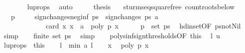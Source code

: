 \begin{isabellebody}
\ \ \ \ \ \ \isamarkupfalse%
\ lu{\isacharunderscore}props\ \isamarkupfalse%
\ auto\isanewline
\ \ \isamarkupfalse%
\ \isamarkupfalse%
\ {\isacharquery}thesis\ \isacommand{{\isachardot}}\isamarkupfalse%
\isanewline
{}\isamarkupfalse%
%
\endisatagproof
{\isafoldproof}%
%
\isadelimproof
\isanewline
%
\endisadelimproof
\isanewline
{}\isamarkupfalse%
\ {\isacharparenleft}\ sturm{\isacharunderscore}seq{\isacharunderscore}squarefree{\isacharparenright}\ count{\isacharunderscore}roots{\isacharunderscore}below{\isacharcolon}\isanewline
\ \ \ {\isachardoublequoteopen}p\ {\isasymnoteq}\ {}{\isachardoublequoteclose}\isanewline
\ \ \ {\isachardoublequoteopen}sign{\isacharunderscore}changes{\isacharunderscore}neg{\isacharunderscore}inf\ ps\ {\isacharminus}\ sign{\isacharunderscore}changes\ ps\ a\ {\isacharequal}\ \isanewline
\ \ \ \ \ \ \ \ \ \ \ \ \ card\ {\isacharbraceleft}x{\isachardot}\ x\ {\isasymle}\ a\ {\isasymand}\ poly\ p\ x\ {\isacharequal}\ {}{\isacharbraceright}{\isachardoublequoteclose}\isanewline
%
\isadelimproof
%
\endisadelimproof
%
\isatagproof
{}\isamarkupfalse%
{\isacharminus}\isanewline
\ \ \isamarkupfalse%
\ {\isachardoublequoteopen}p\ {\isasymin}\ set\ ps{\isachardoublequoteclose}\ \isamarkupfalse%
\ hd{\isacharunderscore}in{\isacharunderscore}set{\isacharbrackleft}OF\ ps{\isacharunderscore}not{\isacharunderscore}Nil{\isacharbrackright}\ \isamarkupfalse%
\ simp\isanewline
\ \ \isamarkupfalse%
\ {\isachardoublequoteopen}finite\ {\isacharparenleft}set\ ps{\isacharparenright}{\isachardoublequoteclose}\ \isamarkupfalse%
\ simp\isanewline
\ \ \isamarkupfalse%
\ polys{\isacharunderscore}inf{\isacharunderscore}sign{\isacharunderscore}thresholds{\isacharbrackleft}OF\ this{\isacharbrackright}\ \isamarkupfalse%
\ l\ u\ \isacommand{{\isachardot}}\isamarkupfalse%
\isanewline
\ \ \isamarkupfalse%
\ lu{\isacharunderscore}props\ {\isacharequal}\ this\isanewline
\ \ \isamarkupfalse%
\ {\isacharquery}l\ {\isacharequal}\ {\isachardoublequoteopen}min\ a\ l{\isachardoublequoteclose}\isanewline
\ \ \isacommand{{\isacharbraceleft}}\isamarkupfalse%
\isamarkupfalse%
\ x\ \isamarkupfalse%
\ {\isachardoublequoteopen}poly\ p\ x\ {\isacharequal}\ {}{\isachardoublequoteclose}\ \isamarkupfalse%

\end{isabellebody}
